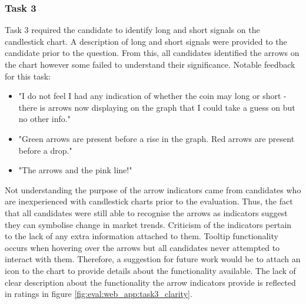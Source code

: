 

\subsubsection{Task 3}
\label{sec:evaluation:ui:tasks:q3}
\noindent Task 3 required the candidate to identify long and short signals on the candlestick chart. A description of long and short signals were provided to the candidate prior to the question. From this, all candidates identified the arrows on the chart however some failed to understand their significance. Notable feedback for this task:
\begin{itemize}
    \item "I do not feel I had any indication of whether the coin may long or short - there is arrows now displaying on the graph that I could take a guess on but no other info."
    \item "Green arrows are present before a rise in the graph. Red arrows are present before a drop."
    \item "The arrows and the pink line!"
\end{itemize}
Not understanding the purpose of the arrow indicators came from candidates who are inexperienced with candlestick charts prior to the evaluation. Thus, the fact that all candidates were still able to recognise the arrows as indicators suggest they can symbolise change in market trends. Criticism of the indicators pertain to the lack of any extra information attached to them. Tooltip functionality occurs when hovering over the arrows but all candidates never attempted to interact with them. Therefore, a suggestion for future work would be to attach an icon to the chart to provide details about the functionality available. The lack of clear description about the functionality the arrow indicators provide is reflected in ratings in figure \ref{fig:eval:web_app:task3_clarity}. 



